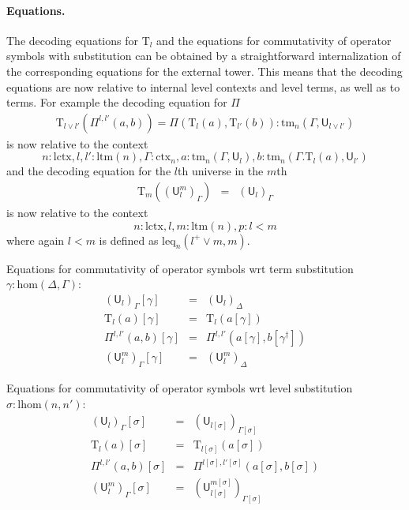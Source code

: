 \documentclass[submission,copyright,creativecommons]{eptcs}
\newcommand{\UU}{\mathsf{U}}
\def\lhom{\mathrm{lhom}}
\def\UU{\mathsf{U}}
\newcommand{\N}{\mathsf{N}}
\def\sub{\mathrm{hom}}
\def\lctx{\mathrm{lctx}}
\def\ltm{\mathrm{ltm}}
\def\leq{\mathrm{leq}}
\newcommand{\ctx}{\mathrm{ctx}}
\newcommand{\tm}{\mathrm{tm}}
\def\U{\mathsf{U}}
\newcommand{\Ta}{\mathrm{T}}
\begin{document}
\paragraph{Equations.}
The decoding equations for $\Ta_l$ and the equations for commutativity of operator symbols with substitution can be obtained by a straightforward internalization of the corresponding equations for the external tower. This means that the decoding equations are now relative to internal level contexts and level terms, as well as to terms. For example the decoding equation for $\Pi$
\begin{eqnarray*}
\Ta_{l \vee l'}(\Pi^{l,l'}(a,b)) = \Pi(\Ta_l(a),\Ta_{l'}(b)) :\tm_n(\Gamma,\UU_{l \vee l'})
\end{eqnarray*}
is now relative to the context
$$
n : \lctx, l, l' : \ltm(n), \Gamma : \ctx_n, a : \tm_n(\Gamma,\UU_l), b : \tm_n(\Gamma.\Ta_l(a),\UU_{l'} )
$$
and the decoding equation for the $l$th universe in the $m$th
\begin{eqnarray*}
\Ta_{m}((\UU^m_l)_\Gamma) &=& (\UU_l)_\Gamma
\end{eqnarray*}
is now relative to the context
$$
n : \lctx, l, m : \ltm(n), p : l < m
$$
where again $l < m$ is defined as $\leq_n(l^+ \vee m, m)$.

Equations for commutativity of operator symbols wrt term substitution $\gamma : \sub(\Delta,\Gamma)$:
 \begin{eqnarray*}
(\U_l)_\Gamma [ \gamma ] &=& (\U_l)_\Delta\\
\Ta_l(a) [ \gamma ] &=& \Ta_l(a[ \gamma ] )\\
\Pi^{l,l'}(a,b)[ \gamma ] &=& \Pi^{l,l'}(a [ \gamma ], b[ \gamma^\dagger ])\\
(\UU^m_l)_\Gamma[ \gamma ] &=&(\UU^m_l)_\Delta
\end{eqnarray*}

Equations for commutativity of operator symbols wrt level substitution $\sigma: \lhom(n,n')$:  \begin{eqnarray*}
 (\U_{l})_\Gamma[\sigma] &=& (\U_{l[\sigma]})_{\Gamma[\sigma]}\\
 \Ta_l(a) [ \sigma ] &=& \Ta_{l[\sigma]}(a[ \sigma ] )\\
\Pi^{l,l'}(a,b)[ \sigma ] &=& \Pi^{l[ \sigma ] ,l'[ \sigma ] }(a [ \sigma ], b[ \sigma])\\
(\UU^m_l)_\Gamma[ \sigma ] &=&(\UU^{m[\sigma]}_{l[ \sigma ]} )_{\Gamma[ \sigma ]}
 \end{eqnarray*}
\end{document}
